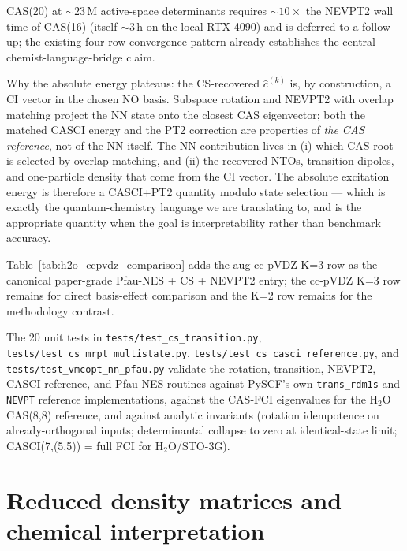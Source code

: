 \documentclass[journal=jctcce,manuscript=suppinfo,layout=traditional]{achemso}
\begin{document}
CAS(20) at $\sim 23$\,M active-space determinants requires
$\sim 10\times$ the NEVPT2 wall time of CAS(16) (itself $\sim 3$\,h
on the local RTX 4090) and is deferred to a follow-up; the
existing four-row convergence pattern already establishes the
central chemist-language-bridge claim.

\noindent Why the absolute energy plateaus: the CS-recovered
$\widehat c^{(k)}$ is, by construction, a CI vector in the
chosen NO basis. Subspace rotation and NEVPT2 with overlap
matching project the NN state onto the closest CAS eigenvector;
both the matched CASCI energy and the PT2 correction are
properties of \emph{the CAS reference}, not of the NN itself. The
NN contribution lives in (i) which CAS root is selected by
overlap matching, and (ii) the recovered NTOs, transition dipoles,
and one-particle density that come from the CI vector. The
absolute excitation energy is therefore a CASCI+PT2 quantity
modulo state selection --- which is exactly the quantum-chemistry
language we are translating to, and is the appropriate quantity
when the goal is interpretability rather than benchmark accuracy.

\bigskip
Table~\ref{tab:h2o_ccpvdz_comparison} adds the aug-cc-pVDZ K=3 row
as the canonical paper-grade Pfau-NES + CS + NEVPT2 entry; the
cc-pVDZ K=3 row remains for direct basis-effect comparison and the
K=2 row remains for the methodology contrast.

The 20 unit tests in
\texttt{tests/test\_cs\_transition.py},
\texttt{tests/test\_cs\_mrpt\_multistate.py},
\texttt{tests/test\_cs\_casci\_reference.py}, and
\texttt{tests/test\_vmcopt\_nn\_pfau.py} validate the rotation,
transition, NEVPT2, CASCI reference, and Pfau-NES routines against
PySCF's own \texttt{trans\_rdm1s} and \texttt{NEVPT} reference
implementations, against the CAS-FCI eigenvalues for the H$_2$O
CAS(8,8) reference, and against analytic invariants (rotation
idempotence on already-orthogonal inputs; determinantal collapse
to zero at identical-state limit; CASCI(7,(5,5)) = full FCI for
H$_2$O/STO-3G).

\section{Reduced density matrices and chemical interpretation}
\label{sec:supp_rdm}
\label{sec:rdm_apps}
\end{document}
